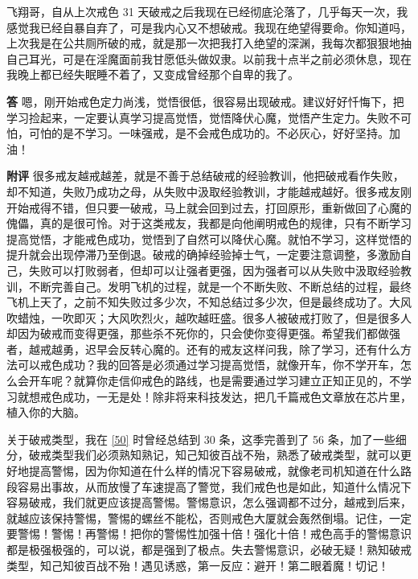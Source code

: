 \begin{case}
    飞翔哥，自从上次戒色 31 天破戒之后我现在已经彻底沦落了，几乎每天一次，我感觉我已经自暴自弃了，可是我内心又不想破戒。我现在绝望得要命。你知道吗，上次我是在公共厕所破的戒，就是那一次把我打入绝望的深渊，我每次都狠狠地抽自己耳光，可是在淫魔面前我甘愿低头做奴隶。以前我十点半之前必须休息，现在我晚上都已经失眠睡不着了，又变成曾经那个自卑的我了。

    \textbf{答} 嗯，刚开始戒色定力尚浅，觉悟很低，很容易出现破戒。建议好好忏悔下，把学习捡起来，一定要认真学习提高觉悟，觉悟降伏心魔，觉悟产生定力。失败不可怕，可怕的是不学习。一味强戒，是不会戒色成功的。不必灰心，好好坚持。加油！

    \textbf{附评} 很多戒友越戒越差，就是不善于总结破戒的经验教训，他把破戒看作失败，却不知道，失败乃成功之母，从失败中汲取经验教训，才能越戒越好。很多戒友刚开始戒得不错，但只要一破戒，马上就会回到过去，打回原形，重新做回了心魔的傀儡，真的是很可怜。对于这类戒友，我都是向他阐明戒色的规律，只有不断学习提高觉悟，才能戒色成功，觉悟到了自然可以降伏心魔。就怕不学习，这样觉悟的提升就会出现停滞乃至倒退。破戒的确掉经验掉士气，一定要注意调整，多激励自己，失败可以打败弱者，但却可以让强者更强，因为强者可以从失败中汲取经验教训，不断完善自己。发明飞机的过程，就是一个不断失败、不断总结的过程，最终飞机上天了，之前不知失败过多少次，不知总结过多少次，但是最终成功了。大风吹蜡烛，一吹即灭；大风吹烈火，越吹越旺盛。很多人被破戒打败了，但是很多人却因为破戒而变得更强，那些杀不死你的，只会使你变得更强。希望我们都做强者，越戒越勇，迟早会反转心魔的。还有的戒友这样问我，除了学习，还有什么方法可以戒色成功？我的回答是必须通过学习提高觉悟，就像开车，你不学开车，怎么会开车呢？就算你走信仰戒色的路线，也是需要通过学习建立正知正见的，不学习就想戒色成功，一无是处！除非将来科技发达，把几千篇戒色文章放在芯片里，植入你的大脑。
\end{case}

关于破戒类型，我在 \ref{50} 时曾经总结到 30 条，这季完善到了 56 条，加了一些细分，破戒类型我们必须熟知熟记，知己知彼百战不殆，熟悉了破戒类型，就可以更好地提高警惕，因为你知道在什么样的情况下容易破戒，就像老司机知道在什么路段容易出事故，从而放慢了车速提高了警觉，我们戒色也是如此，知道什么情况下容易破戒，我们就更应该提高警惕。警惕意识，怎么强调都不过分，越戒到后来，就越应该保持警惕，警惕的螺丝不能松，否则戒色大厦就会轰然倒塌。记住，一定要警惕！警惕！再警惕！把你的警惕性加强十倍！强化十倍！戒色高手的警惕意识都是极强极强的，可以说，都是强到了极点。失去警惕意识，必破无疑！熟知破戒类型，知己知彼百战不殆！遇见诱惑，第一反应：避开！第二眼着魔！切记！

